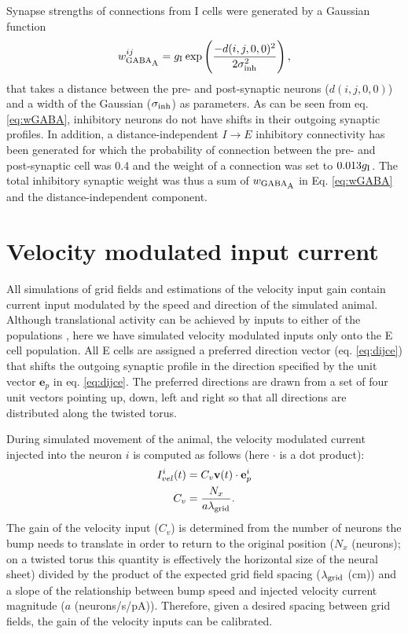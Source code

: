 \documentclass[a4paper,12pt]{article}
\newcommand{\ssc}[3]{\ensuremath{#1_{\text{#2}_{\text{#3}}}}}
\newcommand{\wGABAA  }{\ssc{w}      {\scriptsize{GABA}}{\scriptsize{A}}}
\newcommand{\sigmasub}[1]{\ssc{\sigma}{\scriptsize{#1}}{}}
\newcommand{\gI      }{\ssc{g}      {\scriptsize{I}}{}}
\newcommand{\dijzz}{\ensuremath{d(i, j, 0, 0)}}
\newcommand{\lamgrid}{\ssc{\lambda}{\scriptsize{grid}}{}}
\begin{document}
Synapse strengths of connections from I cells were generated by a Gaussian
function
\begin{equation}
    \wGABAA^{ij} = \gI \exp\left(\frac{-d(i, j, 0, 0)^2}{2 \sigmasub{inh}^2}\right),
    \label{eq:wGABA}
\end{equation}
that takes a distance between the pre- and post-synaptic neurons (\dijzz) and a
width of the Gaussian (\sigmasub{inh}) as parameters. As can be seen from eq.
\eqref{eq:wGABA}, inhibitory neurons do not have shifts in their outgoing
synaptic profiles. In addition, a distance-independent $I \rightarrow E$
inhibitory connectivity has been generated for which the probability of connection
between the pre- and post-synaptic cell was 0.4 and the weight of a connection
was set to $0.013\gI$. The total inhibitory synaptic weight was thus a sum of
$\wGABAA$ in Eq. \eqref{eq:wGABA} and the distance-independent component.




\section{Velocity modulated input current } \label{sec:Ivel}

All simulations of grid fields and estimations of the velocity input gain
contain current input modulated by the speed and direction of the simulated
animal. Although translational activity can be achieved by inputs to either of
the populations \citep{Pastoll:2013ff}, here we have simulated velocity
modulated inputs only onto the E cell population. All E cells are assigned a
preferred direction vector (eq. \ref{eq:dijce}) that shifts the outgoing
synaptic profile in the direction specified by the unit vector $\mathbf{e}_p$
in eq. \eqref{eq:dijce}. The preferred directions are drawn from a set of four
unit vectors pointing up, down, left and right so that all directions are
distributed along the twisted torus.

During simulated movement of the animal, the velocity modulated current
injected into the neuron $i$ is computed as follows (here $\cdot$ is a dot
product):
\begin{eqnarray}
    I_{vel}^i(t) &= C_v \mathbf{v}(t) \cdot \mathbf{e}_p^i \notag \\
    C_v          &= \frac{N_x}{a\lamgrid}.
\end{eqnarray}
The gain of the velocity input ($C_v$) is determined from the number of neurons
the bump needs to translate in order to return to the original position
($N_x$ (neurons); on a twisted torus this quantity is effectively the horizontal size of
the neural sheet) divided by the product of the expected grid field spacing
($\lamgrid$ (cm)) and a slope of the relationship between bump speed and injected
velocity current magnitude ($a$ (neurons/s/pA)). Therefore, given a desired
spacing between grid fields, the gain of the velocity inputs can be calibrated.
\end{document}
